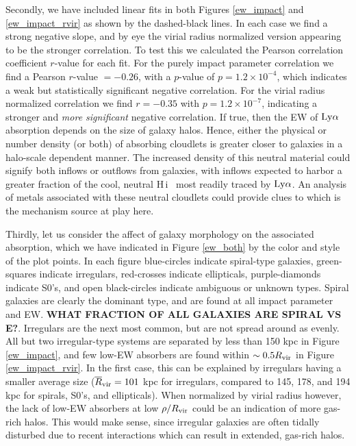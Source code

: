 \documentclass[twocolumn,tighten]{aastex62}
\newcommand{\HI}{\mbox{H\,{\sc i}} }
\begin{document}
Secondly, we have included linear fits in both Figures \ref{ew_impact} and \ref{ew_impact_rvir} as shown by the dashed-black lines. In each case we find a strong negative slope, and by eye the virial radius normalized version appearing to be the stronger correlation. To test this we calculated the Pearson correlation coefficient $r$-value for each fit. For the purely impact parameter correlation we find a Pearson $r$-value $=-0.26$, with a $p$-value of $p = 1.2 \times 10^{-4}$, which indicates a weak but statistically significant negative correlation. For the virial radius normalized correlation we find $r = -0.35$ with $p = 1.2 \times 10^{-7}$, indicating a stronger and \emph{more significant} negative correlation. If true, then the EW of $\rm Ly\alpha$ absorption depends on the size of galaxy halos. Hence, either the physical or number density (or both) of absorbing cloudlets is greater closer to galaxies in a halo-scale dependent manner. The increased density of this neutral material could signify both inflows or outflows from galaxies, with inflows expected to harbor a greater fraction of the cool, neutral \HI~most readily traced by $\rm Ly\alpha$. An analysis of metals associated with these neutral cloudlets could provide clues to which is the mechanism source at play here.

Thirdly, let us consider the affect of galaxy morphology on the associated absorption, which we have indicated in Figure \ref{ew_both} by the color and style of the plot points. In each figure blue-circles indicate spiral-type galaxies, green-squares indicate irregulars, red-crosses indicate ellipticals, purple-diamonds indicate S0's, and open black-circles indicate ambiguous or unknown types. Spiral galaxies are clearly the dominant type, and are found at all impact parameter and EW. \textbf{WHAT FRACTION OF ALL GALAXIES ARE SPIRAL VS E?}. Irregulars are the next most common, but are not spread around as evenly. All but two irregular-type systems are separated by less than 150 kpc in Figure \ref{ew_impact}, and few low-EW absorbers are found within $\sim 0.5 R_{\rm vir}$ in Figure \ref{ew_impact_rvir}. In the first case, this can be explained by irregulars having a smaller average size ($\overline{R}_{\rm vir} = 101$ kpc for irregulars, compared to 145, 178, and 194 kpc for spirals, S0's, and ellipticals). When normalized by virial radius however, the lack of low-EW absorbers at low $\rho / R_{\rm vir}$ could be an indication of more gas-rich halos. This would make sense, since irregular galaxies are often tidally disturbed due to recent interactions which can result in extended, gas-rich halos.
\end{document}
